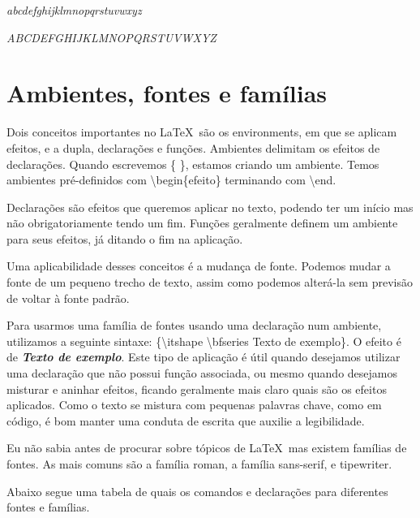 \documentclass[a4paper, 12pt, oneside]{book}
\begin{document}
\textsl{abcdefghijklmnopqrstuvwxyz}

\textsl{ABCDEFGHIJKLMNOPQRSTUVWXYZ}


\section{Ambientes, fontes e famílias}
Dois conceitos importantes no \LaTeX\ são os environments,
em que se aplicam efeitos, e a dupla, declarações e funções.
Ambientes delimitam os efeitos de declarações.
Quando escrevemos \{ \}, estamos criando um ambiente.
Temos ambientes pré-definidos com \textbackslash begin\{efeito\} terminando com \textbackslash end.

Declarações são efeitos que queremos aplicar no texto, podendo ter um início mas não obrigatoriamente tendo um fim.
Funções geralmente definem um ambiente para seus efeitos, já ditando o fim na aplicação.

Uma aplicabilidade desses conceitos é a mudança de fonte.
Podemos mudar a fonte de um pequeno trecho de texto, assim como podemos alterá-la sem previsão de voltar à fonte padrão.

Para usarmos uma família de fontes usando uma declaração num ambiente, utilizamos a seguinte sintaxe:
\{\textbackslash itshape \textbackslash bfseries Texto de exemplo\}.
O efeito é de {\itshape \bfseries Texto de exemplo}.
Este tipo de aplicação é útil quando desejamos utilizar uma declaração que não possui função associada,
ou mesmo quando desejamos misturar e aninhar efeitos, ficando geralmente mais claro quais são os efeitos aplicados.
Como o texto se mistura com pequenas palavras chave, como em código, é bom manter uma conduta de escrita que auxilie a legibilidade.

Eu não sabia antes de procurar sobre tópicos de \LaTeX\, mas existem famílias de fontes.
As mais comuns são a família roman, a família sans-serif, e tipewriter.

Abaixo segue uma tabela de quais os comandos e declarações para diferentes fontes e famílias.
\end{document}
